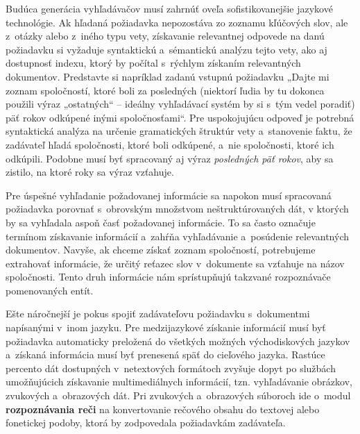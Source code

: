 \begin{multicols}{2}
Budúca generácia vyhľadávačov musí zahrnúť oveľa sofistikovanejšie jazykové technológie. Ak hľadaná požiadavka nepozostáva zo zoznamu kľúčových slov, ale z~otázky alebo z~iného typu vety, získavanie relevantnej odpovede na danú požiadavku si vyžaduje syntaktickú a~sémantickú analýzu tejto vety, ako aj dostupnosť indexu, ktorý by počítal s~rýchlym získaním relevantných dokumentov. Predstavte si napríklad zadanú vstupnú požiadavku „Dajte mi zoznam spoločností, ktoré boli za posledných (niektorí ľudia by tu dokonca použili výraz „ostatných“ – ideálny vyhľadávací systém by si s~tým vedel poradiť) päť rokov odkúpené inými spoločnosťami“. Pre uspokojujúcu odpoveď je potrebná syntaktická analýza na určenie gramatických štruktúr vety a~stanovenie faktu, že zadávateľ hľadá spoločnosti, ktoré boli odkúpené, a~nie spoločnosti, ktoré ich odkúpili. Podobne musí byť spracovaný aj výraz \emph{posledných päť rokov}, aby sa zistilo, na ktoré roky sa výraz vzťahuje. 


Pre úspešné vyhľadanie požadovanej informácie sa napokon musí spracovaná požiadavka porovnať s~obrovským množstvom neštruktúrovaných dát, v ktorých by sa vyhľadala aspoň časť požadovanej informácie. To sa často označuje termínom získavanie informácií a~zahŕňa vyhľadávanie a~posúdenie relevantných dokumentov. Navyše, ak chceme získať zoznam spoločností, potrebujeme extrahovať informácie, že určitý reťazec slov v~dokumente sa vzťahuje na názov spoločnosti. Tento druh informácie nám sprístupňujú takzvané rozpoznávače pomenovaných entít.

Ešte náročnejší je pokus spojiť zadávateľovu požiadavku
s~dokumentmi napísanými v~inom jazyku. Pre medzijazykové
získanie informácií musí byť požiadavka automaticky preložená
do všetkých možných východiskových jazykov a~získaná informácia
musí byť prenesená späť do cieľového jazyka. Rastúce percento
dát dostupných v~netextových formátoch zvyšuje dopyt po službách
umožňujúcich získavanie multimediálnych informácií,
tzn. vyhľadávanie obrázkov, zvukových a~obrazových dát. Pri
zvukových a~obrazových súboroch ide o~modul \textbf{rozpoznávania
reči} na konvertovanie rečového obsahu do textovej alebo fonetickej
podoby, ktorá by zodpovedala požiadavkám zadávateľa.


\end{multicols}
